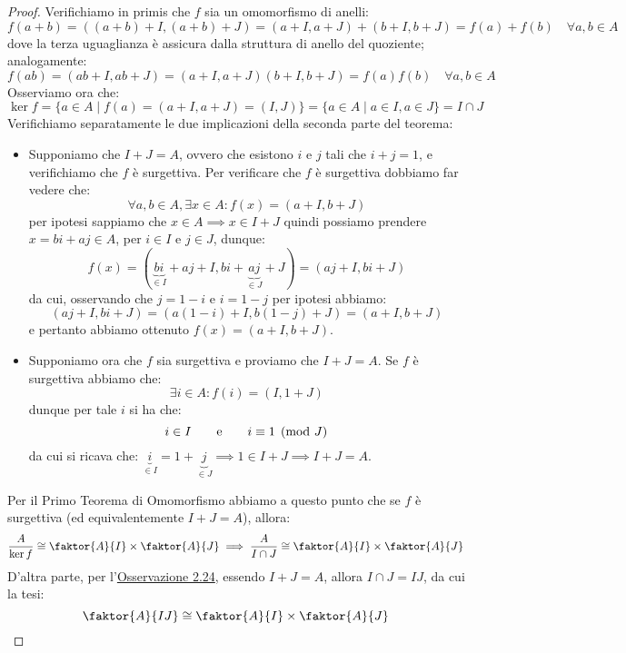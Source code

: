 \documentclass[11pt]{scrartcl}
\begin{document}
\begin{proof}
    Verifichiamo in primis che $f$ sia un omomorfismo di anelli:
        \[ f(a+b) = ((a+b)+I,(a+b)+J) = (a+I,a+J) + (b+I,b+J) = f(a)+f(b) \quad \forall a,b \in A
            \]
    dove la terza uguaglianza è assicura dalla struttura di anello del quoziente; analogamente:
        \[ f(ab) = (ab+I,ab+J) = (a+I,a+J)(b+I,b+J) = f(a)f(b) \quad \forall a,b \in A
            \]
    Osserviamo ora che:
        \[ \ker f =\{a \in A \mid f(a) = (a+I,a+J) = (I,J)\} = \{a\in A \mid a \in I, a \in J\} = I \cap J
            \]
    Verifichiamo separatamente le due implicazioni della seconda parte del teorema:
    \begin{itemize}
        \item Supponiamo che $I+J = A$, ovvero che esistono $i$ e $j$ tali che $i+j = 1$,
        e verifichiamo che $f$ è surgettiva. Per verificare che $f$ è surgettiva dobbiamo far vedere che:
            \[ \forall a,b \in A, \exists x \in A : f(x) = (a+I,b+J)
                \]
        per ipotesi sappiamo che $x \in A \implies x \in I+J$ quindi possiamo prendere $x = bi + aj \in A$, per $i \in I$ e $j \in J$, dunque:
            \[ f(x) = (\underbrace{bi}_{\in I} + aj + I, bi + \underbrace{aj}_{\in J} + J) = (aj + I, bi +J)
                \]
        da cui, osservando che $j = 1-i$ e $i = 1 - j$ per ipotesi abbiamo:
            \[ (aj+I,bi+J) = (a(1-i)+I,b(1-j)+J) = (a+I,b+J)
                \]
        e pertanto abbiamo ottenuto $f(x) = (a+I,b+J)$.
        \item Supponiamo ora che $f$ sia surgettiva e proviamo che $I+J = A$. Se $f$ è surgettiva abbiamo che:
            \[ \exists i \in A : f(i) = (I,1+J)
                \]
        dunque per tale $i$ si ha che:
            \[ i \in I \qquad \text e \qquad i \equiv 1 \pmod J
                \]
        da cui si ricava che: $\underbrace{i}_{\in I} = 1 + \underbrace{j}_{\in J} \implies 1 \in I+J \implies I+J = A$.
    \end{itemize}
    Per il Primo Teorema di Omomorfismo abbiamo a questo punto che se $f$ è surgettiva (ed equivalentemente $I+J = A$), allora:
            \[ \frac{A}{\ker f} \cong \faktor{A}{I} \times \faktor{A}{J} \implies \frac{A}{I \cap J} \cong \faktor{A}{I} \times \faktor{A}{J}
                \]
    D'altra parte, per l'\hyperref[2.24]{Osservazione 2.24}, essendo $I+J = A$, allora $I \cap J = IJ$, da cui la tesi:
        \[\faktor{A}{IJ} \cong \faktor{A}{I} \times \faktor{A}{J}
            \]
\end{proof}
\end{document}
